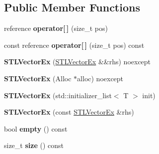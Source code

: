 \subsection*{Public Member Functions}
\begin{DoxyCompactItemize}
\item 
\mbox{\label{classnabla_1_1_s_t_l_vector_ex_afde528e33bdf0672764cc4047609461f}} 
reference {\bfseries operator\mbox{[}$\,$\mbox{]}} (size\+\_\+t pos)
\item 
\mbox{\label{classnabla_1_1_s_t_l_vector_ex_a79cab881aa996c3a2bc38cadbb5bd0f8}} 
const reference {\bfseries operator\mbox{[}$\,$\mbox{]}} (size\+\_\+t pos) const
\item 
\mbox{\label{classnabla_1_1_s_t_l_vector_ex_af54fc79021cf621afaa365fb8e32606a}} 
{\bfseries S\+T\+L\+Vector\+Ex} (\mbox{\hyperlink{classnabla_1_1_s_t_l_vector_ex}{S\+T\+L\+Vector\+Ex}} \&\&rhs) noexcept
\item 
\mbox{\label{classnabla_1_1_s_t_l_vector_ex_a9b384c76cce66b063d1c5349fbcf2210}} 
{\bfseries S\+T\+L\+Vector\+Ex} (Alloc $\ast$alloc) noexcept
\item 
\mbox{\label{classnabla_1_1_s_t_l_vector_ex_abd416a0904ed0cefaedcd4c22b7a9818}} 
{\bfseries S\+T\+L\+Vector\+Ex} (std\+::initializer\+\_\+list$<$ T $>$ init)
\item 
\mbox{\label{classnabla_1_1_s_t_l_vector_ex_a806b14a4669228eac919caa37fcf9b75}} 
{\bfseries S\+T\+L\+Vector\+Ex} (const \mbox{\hyperlink{classnabla_1_1_s_t_l_vector_ex}{S\+T\+L\+Vector\+Ex}} \&rhs)
\item 
\mbox{\label{classnabla_1_1_s_t_l_vector_ex_a4f7dc09d999e0d82fae18a2d7fb4c1e8}} 
bool {\bfseries empty} () const
\item 
\mbox{\label{classnabla_1_1_s_t_l_vector_ex_a1b4a4d968613137772046331b1264e1f}} 
size\+\_\+t {\bfseries size} () const
\item 
\mbox{\label{classnabla_1_1_s_t_l_vector_ex_ae9b5a1aae10abfb18a922b58a47c35b0}} 

\end{DoxyCompactItemize}
